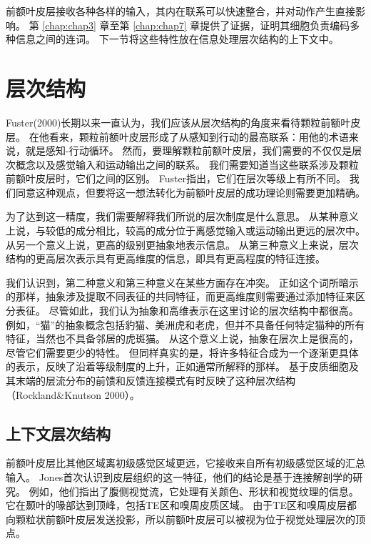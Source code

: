 前额叶皮层接收各种各样的输入，其内在联系可以快速整合，并对动作产生直接影响。
第 \ref{chap:chap3} 章至第 \ref{chap:chap7} 章提供了证据，证明其细胞负责编码多种信息之间的连词。
下一节将这些特性放在信息处理层次结构的上下文中。



\section{层次结构}
\par

Fuster(2000)长期以来一直认为，我们应该从层次结构的角度来看待颗粒前额叶皮层。
在他看来，颗粒前额叶皮层形成了从感知到行动的最高联系：用他的术语来说，就是感知-行动循环。
然而，要理解颗粒前额叶皮层，我们需要的不仅仅是层次概念以及感觉输入和运动输出之间的联系。
我们需要知道当这些联系涉及颗粒前额叶皮层时，它们之间的区别。
Fuster指出，它们在层次等级上有所不同。
我们同意这种观点，但要将这一想法转化为前额叶皮层的成功理论则需要更加精确。
\par


为了达到这一精度，我们需要解释我们所说的层次制度是什么意思。
从某种意义上说，与较低的成分相比，较高的成分位于离感觉输入或运动输出更远的层次中。
从另一个意义上说，更高的级别更抽象地表示信息。
从第三种意义上来说，层次结构的更高层次表示具有更高维度的信息，即具有更高程度的特征连接。
\par


我们认识到，第二种意义和第三种意义在某些方面存在冲突。
正如这个词所暗示的那样，抽象涉及提取不同表征的共同特征，而更高维度则需要通过添加特征来区分表征。
尽管如此，我们认为抽象和高维表示在这里讨论的层次结构中都很高。
例如，“猫”的抽象概念包括豹猫、美洲虎和老虎，但并不具备任何特定猫种的所有特征，当然也不具备邻居的虎斑猫。
从这个意义上说，抽象在层次上是很高的，尽管它们需要更少的特性。
但同样真实的是，将许多特征合成为一个逐渐更具体的表示，反映了沿着等级制度的上升，正如通常所解释的那样。
基于皮质细胞及其末端的层流分布的前馈和反馈连接模式有时反映了这种层次结构（Rockland\&Knutson 2000）。



\subsection{上下文层次结构}
\par
前额叶皮层比其他区域离初级感觉区域更远，它接收来自所有初级感觉区域的汇总输入。
Jones首次认识到皮层组织的这一特征，他们的结论是基于连接解剖学的研究\cite{jones1970anatomical}。
例如，他们指出了腹侧视觉流，它处理有关颜色、形状和视觉纹理的信息。
它在颞叶的喙部达到顶峰，包括TE区和嗅周皮质区域。
由于TE区\cite{webster1994connections}和嗅周皮层\cite{petrides2002association}都向颗粒状前额叶皮层发送投影，所以前额叶皮层可以被视为位于视觉处理层次的顶点\cite{young1992objective}。
\par


